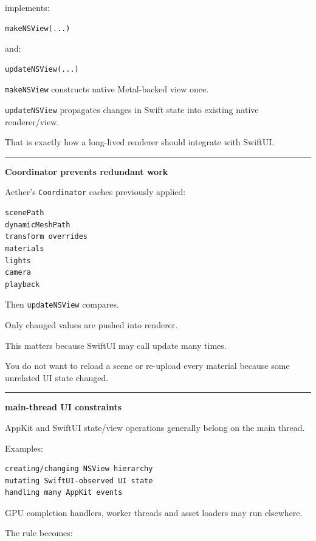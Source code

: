 implements:

\begin{verbatim}
makeNSView(...)
\end{verbatim}

and:

\begin{verbatim}
updateNSView(...)
\end{verbatim}

\texttt{makeNSView} constructs native Metal-backed view once.

\texttt{updateNSView} propagates changes in Swift state into existing native renderer/view.

That is exactly how a long-lived renderer should integrate with SwiftUI.

\begin{center}\rule{0.5\linewidth}{0.5pt}\end{center}

\textbf{Coordinator prevents redundant work}

Aether's \texttt{Coordinator} caches previously applied:

\begin{verbatim}
scenePath
dynamicMeshPath
transform overrides
materials
lights
camera
playback
\end{verbatim}

Then \texttt{updateNSView} compares.

Only changed values are pushed into renderer.

This matters because SwiftUI may call update many times.

You do not want to reload a scene or re-upload every material because some unrelated UI state changed.

\begin{center}\rule{0.5\linewidth}{0.5pt}\end{center}

\textbf{main-thread UI constraints}

AppKit and SwiftUI state/view operations generally belong on the main thread.

Examples:

\begin{verbatim}
creating/changing NSView hierarchy
mutating SwiftUI-observed UI state
handling many AppKit events
\end{verbatim}

GPU completion handlers, worker threads and asset loaders may run elsewhere.

The rule becomes:

